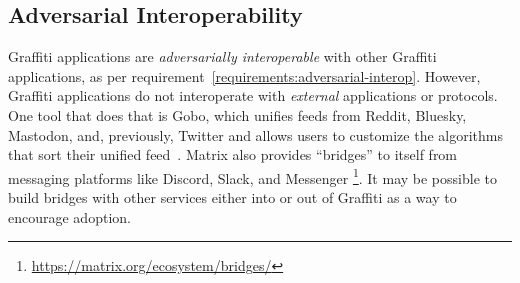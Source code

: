 





\subsection{Adversarial Interoperability}

Graffiti applications are \emph{adversarially interoperable} with other Graffiti
applications, as per requirement~\ref{requirements:adversarial-interop}.
However, Graffiti applications do not interoperate with \emph{external}
applications or protocols.
One tool that does that is Gobo, which unifies feeds from Reddit, Bluesky,
Mastodon, and, previously, Twitter
and allows users to customize the algorithms that sort their unified feed~\cite{gobo}.
Matrix also provides ``bridges'' to itself from messaging platforms like
Discord, Slack, and Messenger
\footnote{
    \url{https://matrix.org/ecosystem/bridges/}
}.
It may be possible to build bridges with other services either into or out of
Graffiti as a way to encourage adoption.


